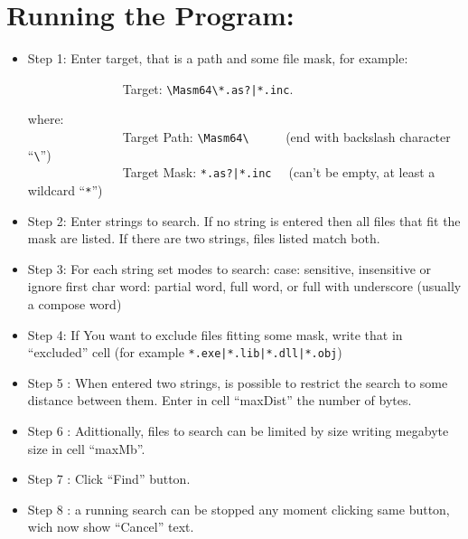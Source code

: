 \documentclass[11pt,a4paper]{scrartcl}
\begin{document}
\title{\color{myblue}{LookingFor }}
\subtitle{\color{myblue}{A Masm64 tool to find strings in files}}

\author{Héctor S. Enrique}
\date{ may 30, 2024}
\maketitle

\section{Running the Program: }

    \begin{itemize}
        \item Step 1: Enter target, that is a path and some file mask, for example:
         
        \verb$              $ Target: \verb$\Masm64\*.as?|*.inc$. 
        
	\hspace{1cm} where:\\
        \verb$              $ Target Path: \verb$\Masm64\     $  (end with backslash character ``\verb$\$'') \\
        \verb$              $ Target Mask: \verb$*.as?|*.inc  $  (can't be empty, at least a wildcard ``\verb$*$'') 
        
        \item Step 2: Enter strings to search. If no string is entered then all files that fit the mask are listed. If there are two strings, files listed match both.
        \item Step 3: For each string set modes to search:
	 \subitem case: sensitive, insensitive or ignore first char
	 \subitem word: partial word, full word, or full with underscore (usually a compose word) 
        \item Step 4:  If You want to exclude files fitting some mask, write that in ``excluded'' cell (for example \verb$*.exe|*.lib|*.dll|*.obj$)
        \item Step 5 : When entered two strings, is possible to restrict the search to some distance between them. Enter in cell ``maxDist'' the number of bytes.
        \item Step 6 : Adittionally, files to search can be limited by size writing megabyte size in cell ``maxMb''.
        \item Step 7 : Click ``Find'' button.
        \item Step 8 : a running search can be stopped any moment clicking same button, wich now show ``Cancel'' text.
     \end{itemize}
\end{document}
